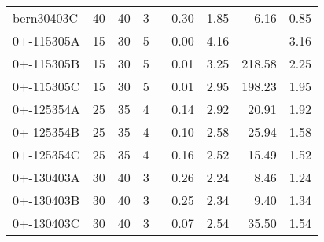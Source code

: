 \begin{scriptsize}
\begin{xtabular*}{\linewidth}{@{\extracolsep{\fill}}lrrrrrrr@{}}
bern30403C & \num{40} & \num{40} & \num{3} & \num{0.30} & \num{1.85} & \num{6.16} & \num{0.85} \\ 
0+-115305A & \num{15} & \num{30} & \num{5} & \num{-0.00} & \num{4.16} & -- & \num{3.16} \\ 
0+-115305B & \num{15} & \num{30} & \num{5} & \num{0.01} & \num{3.25} & \num{218.58} & \num{2.25} \\ 
0+-115305C & \num{15} & \num{30} & \num{5} & \num{0.01} & \num{2.95} & \num{198.23} & \num{1.95} \\ 
0+-125354A & \num{25} & \num{35} & \num{4} & \num{0.14} & \num{2.92} & \num{20.91} & \num{1.92} \\ 
0+-125354B & \num{25} & \num{35} & \num{4} & \num{0.10} & \num{2.58} & \num{25.94} & \num{1.58} \\ 
0+-125354C & \num{25} & \num{35} & \num{4} & \num{0.16} & \num{2.52} & \num{15.49} & \num{1.52} \\ 
0+-130403A & \num{30} & \num{40} & \num{3} & \num{0.26} & \num{2.24} & \num{8.46} & \num{1.24} \\ 
0+-130403B & \num{30} & \num{40} & \num{3} & \num{0.25} & \num{2.34} & \num{9.40} & \num{1.34} \\ 
0+-130403C & \num{30} & \num{40} & \num{3} & \num{0.07} & \num{2.54} & \num{35.50} & \num{1.54} \\ 
\end{xtabular*} 
 \end{scriptsize} 